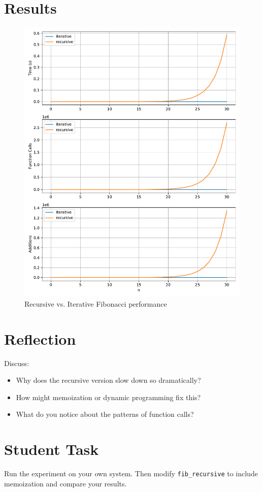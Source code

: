 \section{Results}
\begin{figure}[H]
    \centering
    \includegraphics[width=\textwidth]{chapters/fib_results_plot.pdf}
    \caption{Recursive vs. Iterative Fibonacci performance}
\end{figure}

\section{Reflection}
Discuss:
\begin{itemize}
  \item Why does the recursive version slow down so dramatically?
  \item How might memoization or dynamic programming fix this?
  \item What do you notice about the patterns of function calls?
\end{itemize}

\section{Student Task}
Run the experiment on your own system. 
Then modify \texttt{fib\_recursive} to include memoization and compare your results.

